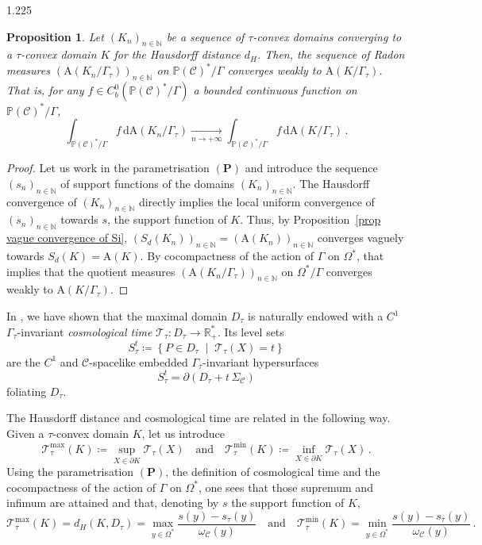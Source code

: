 \documentclass[reqno, a4paper]{amsart}
\numberwithin{equation}{section}
\numberwithin{figure}{section}
\newtheorem{proposition}[theorem]{Proposition}
\theoremstyle{definition}
\theoremstyle{remark}
\newcommand{\R}{\mathbb{R}} %
\newcommand{\N}{\mathbb{N}} %
\renewcommand{\P}{\mathbb{P}} %
\newcommand{\dif}{\mathrm{d}} %
\newcommand{\C}{\mathcal{C}} %
\renewcommand{\S}{\Sigma_\C} %
\newcommand{\Area}{\mathrm{A}} %
\newcommand{\st}{\; \middle\vert \;} %
\begin{document}
\begin{spacing}{1.225}
\begin{proposition}
\label{prop weak cv and Hausdorff}
Let $(K_n)_{n\in\N}$ be a sequence of $\tau$-convex domains converging to a $\tau$-convex domain $K$ for the Hausdorff distance $d_H$. Then, the sequence of Radon measures $(\Area(K_n/\Gamma_\tau))_{n\in\N}$ on $\P(\C)^*/\Gamma$ converges weakly to $\Area(K/\Gamma_\tau)$. That is, for any $f \in C^0_b(\P(\C)^*/\Gamma)$ a bounded continuous function on $\P(\C)^*/\Gamma$, 
\begin{equation*}
\int_{\P(\C)^*/\Gamma} f \, \dif \Area(K_n/\Gamma_\tau) \xrightarrow[n\to +\infty]{} \int_{\P(\C)^*/\Gamma} f \, \dif \Area(K/\Gamma_\tau) \, . 
\end{equation*}
\end{proposition}
\begin{proof}
Let us work in the parametrisation $(\mathbf{P})$ and introduce the sequence $(s_n)_{n\in \N}$ of support functions of the domains $(K_n)_{n\in\N}$. The Hausdorff convergence of $(K_n)_{n\in\N}$ directly implies the local uniform convergence of $(s_n)_{n\in \N}$ towards $s$, the support function of $K$. Thus, by Proposition~\ref{prop vague convergence of Si}, $(S_d(K_n))_{n\in\N} = (\Area(K_n))_{n\in\N}$ converges vaguely towards $S_d(K)=\Area(K)$. By cocompactness of the action of $\Gamma$ on $\Omega^*$, that implies that the quotient measures $(\Area(K_n/\Gamma_\tau))_{n\in\N}$ on $\Omega^*/\Gamma$ converges weakly to $\Area(K/\Gamma_\tau)$. 
\end{proof}

In \cite[Section 6]{Ablondi_25}, we have shown that the maximal domain $D_\tau$ is naturally endowed with a $C^1$ $\Gamma_\tau$-invariant \emph{cosmological time} $\mathcal{T}_\tau:D_\tau\to\R^*_+$. Its level sets
\begin{equation*}
 S^t_\tau \coloneqq \left\lbrace P \in D_\tau \st \mathcal{T}_\tau(X)=t \right\rbrace
\end{equation*}
are the $C^1$ and $\C$-spacelike embedded $\Gamma_\tau$-invariant hypersurfaces
\begin{equation*}
 S^t_\tau = \partial(D_\tau + t \, \S)
\end{equation*}
foliating $D_\tau$. 

The Hausdorff distance and cosmological time are related in the following way. Given a $\tau$-convex domain $K$, let us introduce 
\begin{equation*}
 \mathcal{T}_\tau^{\max} (K) \coloneqq \sup_{X\in \partial K} \mathcal{T}_\tau(X) \quad \text{and} \quad \mathcal{T}_\tau^{\min} (K) \coloneqq \inf_{X\in \partial K} \mathcal{T}_\tau(X) \, . 
\end{equation*}
Using the parametrisation $(\mathbf{P})$, the definition of cosmological time and the cocompactness of the action of $\Gamma$ on $\Omega^*$, one sees that those supremum and infimum are attained and that, denoting by $s$ the support function of $K$,
\begin{equation*}
 \mathcal{T}_\tau^{\max} (K) = d_H(K,D_\tau) = \max_{y \in \Omega^*} \frac{s(y)-s_\tau(y)}{\omega_\C(y)} \quad \text{and} \quad \mathcal{T}_\tau^{\min} (K) = \min_{y \in \Omega^*} \frac{s(y)-s_\tau(y)}{\omega_\C(y)} \, . 
\end{equation*}


\end{spacing}
\end{document}
